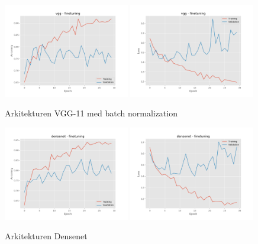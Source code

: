 \documentclass{kththesis}
\begin{document}
  \begin{figure}
    \centering
    \includegraphics[width=0.49\textwidth]{"./fireplace/fireplace-classification - acc - vgg - finetuning"}
    \includegraphics[width=0.49\textwidth]{"./fireplace/fireplace-classification - loss - vgg - finetuning"}
    \caption{Arkitekturen VGG-11 med batch normalization}
  \end{figure}

  \begin{figure}
    \centering
    \includegraphics[width=0.49\textwidth]{"./fireplace/fireplace-classification - acc - densenet - finetuning"}
    \includegraphics[width=0.49\textwidth]{"./fireplace/fireplace-classification - loss - densenet - finetuning"}
    \caption{Arkitekturen Densenet}
  \end{figure}
\end{document}
